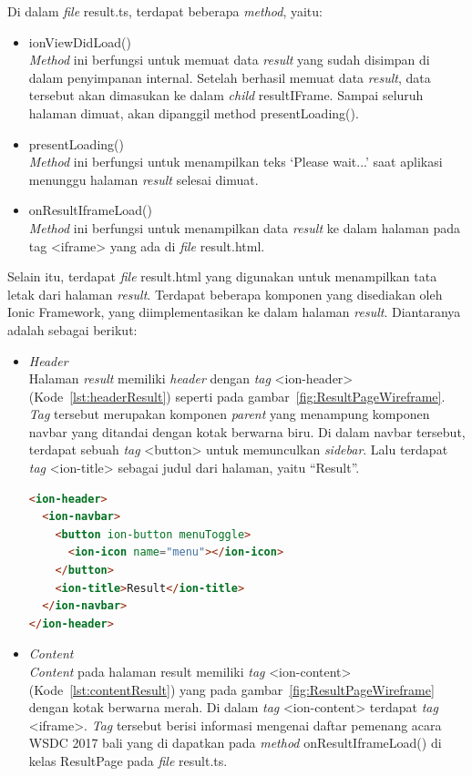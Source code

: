 \begin{itemize}
	Di dalam \textit{file} result.ts, terdapat beberapa \textit{method}, yaitu:
	
	\begin{itemize}
		\item ionViewDidLoad() \\
		\textit{Method} ini berfungsi untuk memuat data \textit{result} yang sudah disimpan di dalam penyimpanan internal. Setelah berhasil memuat data \textit{result}, data tersebut akan dimasukan ke dalam \textit{child} resultIFrame. Sampai seluruh halaman dimuat, akan dipanggil method presentLoading().
		\newpage
		\item presentLoading() \\
		\textit{Method} ini berfungsi untuk menampilkan teks `Please wait...' saat aplikasi menunggu halaman \textit{result} selesai dimuat.
		\item onResultIframeLoad() \\
		\textit{Method} ini berfungsi untuk menampilkan data \textit{result} ke dalam halaman pada tag <iframe> yang ada di \textit{file} result.html.
	\end{itemize}
	
	Selain itu, terdapat \textit{file} result.html yang digunakan untuk menampilkan tata letak dari halaman \textit{result}. Terdapat beberapa komponen yang disediakan oleh Ionic Framework, yang diimplementasikan ke dalam halaman \textit{result}. Diantaranya adalah sebagai berikut:
	
	\begin{itemize}
		\item \textit{Header} \\
		Halaman \textit{result} memiliki \textit{header} dengan \textit{tag} <ion-header> (Kode~\ref{lst:headerResult}) seperti pada gambar~\ref{fig:ResultPageWireframe}. \textit{Tag} tersebut merupakan komponen \textit{parent} yang menampung komponen navbar yang ditandai dengan kotak berwarna biru. Di dalam navbar tersebut, terdapat sebuah \textit{tag} <button> untuk memunculkan \textit{sidebar}. Lalu terdapat \textit{tag} <ion-title> sebagai judul dari halaman, yaitu ``Result''.

\begin{lstlisting}[language=html, label={lst:headerResult}, caption=\textit{Header} pada result.html]
<ion-header>
  <ion-navbar>
    <button ion-button menuToggle>
      <ion-icon name="menu"></ion-icon>
    </button>
    <ion-title>Result</ion-title>
  </ion-navbar>
</ion-header>
\end{lstlisting} 
		\item \textit{Content}\\
		\textit{Content} pada halaman result memiliki \textit{tag} <ion-content> (Kode~\ref{lst:contentResult}) yang pada gambar~\ref{fig:ResultPageWireframe} dengan kotak berwarna merah. Di dalam \textit{tag} <ion-content> terdapat \textit{tag} <iframe>. \textit{Tag} tersebut berisi informasi mengenai daftar pemenang acara WSDC 2017 bali yang di dapatkan pada \textit{method} onResultIframeLoad() di kelas ResultPage pada \textit{file} result.ts.
		

\end{itemize}
\end{itemize}
